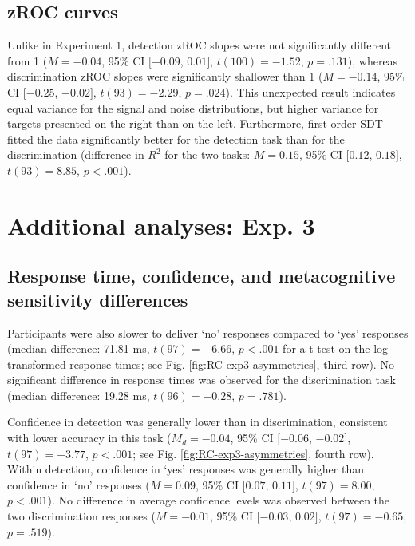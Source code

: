 \documentclass[12pt,twoside]{reedthesis}
\begin{document}
\hypertarget{zroc-curves-1}{%
\subsection{zROC curves}\label{zroc-curves-1}}

Unlike in Experiment 1, detection zROC slopes were not significantly different from 1 (\(M = -0.04\), 95\% CI \([-0.09\), \(0.01]\), \(t(100) = -1.52\), \(p = .131\)), whereas discrimination zROC slopes were significantly shallower than 1 (\(M = -0.14\), 95\% CI \([-0.25\), \(-0.02]\), \(t(93) = -2.29\), \(p = .024\)). This unexpected result indicates equal variance for the signal and noise distributions, but higher variance for targets presented on the right than on the left. Furthermore, first-order SDT fitted the data significantly better for the detection task than for the discrimination (difference in \(R^2\) for the two tasks: \(M = 0.15\), 95\% CI \([0.12\), \(0.18]\), \(t(93) = 8.85\), \(p < .001\)).

\hypertarget{additional-analyses-exp.-3}{%
\section{Additional analyses: Exp. 3}\label{additional-analyses-exp.-3}}

\hypertarget{appRC:asymmetries3}{%
\subsection{Response time, confidence, and metacognitive sensitivity differences}\label{appRC:asymmetries3}}

Participants were also slower to deliver `no' responses compared to `yes' responses (median difference: 71.81 ms, \(t(97) = -6.66\), \(p < .001\) for a t-test on the log-transformed response times; see Fig. \ref{fig:RC-exp3-asymmetries}, third row). No significant difference in response times was observed for the discrimination task (median difference: 19.28 ms, \(t(96) = -0.28\), \(p = .781\)).

Confidence in detection was generally lower than in discrimination, consistent with lower accuracy in this task (\(M_d = -0.04\), 95\% CI \([-0.06\), \(-0.02]\), \(t(97) = -3.77\), \(p < .001\); see Fig. \ref{fig:RC-exp3-asymmetries}, fourth row). Within detection, confidence in `yes' responses was generally higher than confidence in `no' responses (\(M = 0.09\), 95\% CI \([0.07\), \(0.11]\), \(t(97) = 8.00\), \(p < .001\)). No difference in average confidence levels was observed between the two discrimination responses (\(M = -0.01\), 95\% CI \([-0.03\), \(0.02]\), \(t(97) = -0.65\), \(p = .519\)).
\end{document}
